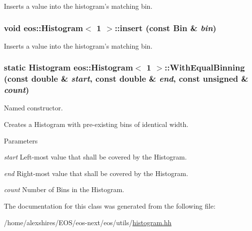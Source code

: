 Inserts a value into the histogram's matching bin. \hypertarget{classeos_1_1Histogram_3_011_01_4_ab36f9b8a8fa6af4cf9df82140c79a1ff}{
\subsubsection[{insert}]{\setlength{\rightskip}{0pt plus 5cm}void eos::Histogram$<$ 1 $>$::insert (const Bin \& {\em bin})}}
\label{classeos_1_1Histogram_3_011_01_4_ab36f9b8a8fa6af4cf9df82140c79a1ff}


Inserts a value into the histogram's matching bin. \hypertarget{classeos_1_1Histogram_3_011_01_4_a06afb7c9698cce0065d220d4a6b8f0e3}{
\subsubsection[{WithEqualBinning}]{\setlength{\rightskip}{0pt plus 5cm}static Histogram eos::Histogram$<$ 1 $>$::WithEqualBinning (const double \& {\em start}, \/  const double \& {\em end}, \/  const unsigned \& {\em count})}}
\label{classeos_1_1Histogram_3_011_01_4_a06afb7c9698cce0065d220d4a6b8f0e3}
Named constructor.

Creates a Histogram with pre-\/existing bins of identical width. 
\begin{DoxyParams}{Parameters}
\item[{\em start}]Left-\/most value that shall be covered by the Histogram. \item[{\em end}]Right-\/most value that shall be covered by the Histogram. \item[{\em count}]Number of Bins in the Histogram. \end{DoxyParams}


The documentation for this class was generated from the following file:\begin{DoxyCompactItemize}
\item 
/home/alexshires/EOS/eos-\/next/eos/utils/\hyperlink{histogram_8hh}{histogram.hh}\end{DoxyCompactItemize}

